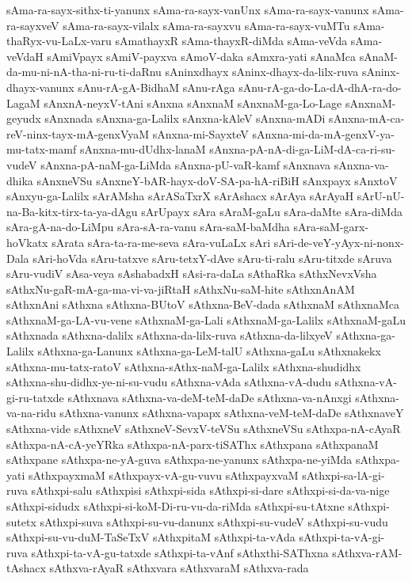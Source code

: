 {sAma-ra-sayx-sithx-ti-yanunx
sAma-ra-sayx-vanUnx
sAma-ra-sayx-vanunx
sAma-ra-sayxveV
sAma-ra-sayx-vilalx
sAma-ra-sayxvu
sAma-ra-sayx-vuMTu
sAma-thaRyx-vu-LaLx-varu
sAmathayxR
sAma-thayxR-diMda
sAma-veVda
sAma-veVdaH
sAmiVpayx
sAmiV-payxva
sAmoV-daka
sAmxra-yati
sAnaMca
sAnaM-da-mu-ni-nA-tha-ni-ru-ti-daRnu
sAninxdhayx
sAninx-dhayx-da-lilx-ruva
sAninx-dhayx-vanunx
sAnu-rA-gA-BidhaM
sAnu-rAga
sAnu-rA-ga-do-La-dA-dhA-ra-do-LagaM
sAnxnA-neyxV-tAni
sAnxna
sAnxnaM
sAnxnaM-ga-Lo-Lage
sAnxnaM-geyudx
sAnxnada
sAnxna-ga-Lalilx
sAnxna-kAleV
sAnxna-mADi
sAnxna-mA-ca-reV-ninx-tayx-mA-genxVyaM
sAnxna-mi-SayxteV
sAnxna-mi-da-mA-genxV-ya-mu-tatx-mamf
sAnxna-mu-dUdhx-lanaM
sAnxna-pA-nA-di-ga-LiM-dA-ca-ri-su-vudeV
sAnxna-pA-naM-ga-LiMda
sAnxna-pU-vaR-kamf
sAnxnava
sAnxna-va-dhika
sAnxneVSu
sAnxneY-bAR-hayx-doV-SA-pa-hA-riBiH
sAnxpayx
sAnxtoV
sAnxyu-ga-Lalilx
sArAMsha
sArASaTxrX
sArAshacx
sArAya
sArAyaH
sArU-nU-na-Ba-kitx-tirx-ta-ya-dAgu
sArUpayx
sAra
sAraM-gaLu
sAra-daMte
sAra-diMda
sAra-gA-na-do-LiMpu
sAra-sA-ra-vanu
sAra-saM-baMdha
sAra-saM-garx-hoVkatx
sArata
sAra-ta-ra-me-seva
sAra-vuLaLx
sAri
sAri-de-veY-yAyx-ni-nonx-Dala
sAri-hoVda
sAru-tatxve
sAru-tetxY-dAve
sAru-ti-ralu
sAru-titxde
sAruva
sAru-vudiV
sAsa-veya
sAshabadxH
sAsi-ra-daLa
sAthaRka
sAthxNevxVsha
sAthxNu-gaR-mA-ga-ma-vi-va-jiRtaH
sAthxNu-saM-hite
sAthxnAnAM
sAthxnAni
sAthxna
sAthxna-BUtoV
sAthxna-BeV-dada
sAthxnaM
sAthxnaMca
sAthxnaM-ga-LA-vu-vene
sAthxnaM-ga-Lali
sAthxnaM-ga-Lalilx
sAthxnaM-gaLu
sAthxnada
sAthxna-dalilx
sAthxna-da-lilx-ruva
sAthxna-da-lilxyeV
sAthxna-ga-Lalilx
sAthxna-ga-Lanunx
sAthxna-ga-LeM-talU
sAthxna-gaLu
sAthxnakekx
sAthxna-mu-tatx-ratoV
sAthxna-sAthx-naM-ga-Lalilx
sAthxna-shudidhx
sAthxna-shu-didhx-ye-ni-su-vudu
sAthxna-vAda
sAthxna-vA-dudu
sAthxna-vA-gi-ru-tatxde
sAthxnava
sAthxna-va-deM-teM-daDe
sAthxna-va-nAnxgi
sAthxna-va-na-ridu
sAthxna-vanunx
sAthxna-vapapx
sAthxna-veM-teM-daDe
sAthxnaveY
sAthxna-vide
sAthxneV
sAthxneV-SevxV-teVSu
sAthxneVSu
sAthxpa-nA-cAyaR
sAthxpa-nA-cA-yeYRka
sAthxpa-nA-parx-tiSAThx
sAthxpana
sAthxpanaM
sAthxpane
sAthxpa-ne-yA-guva
sAthxpa-ne-yanunx
sAthxpa-ne-yiMda
sAthxpa-yati
sAthxpayxmaM
sAthxpayx-vA-gu-vuvu
sAthxpayxvaM
sAthxpi-sa-lA-gi-ruva
sAthxpi-salu
sAthxpisi
sAthxpi-sida
sAthxpi-si-dare
sAthxpi-si-da-va-nige
sAthxpi-sidudx
sAthxpi-si-koM-Di-ru-vu-da-riMda
sAthxpi-su-tAtxne
sAthxpi-sutetx
sAthxpi-suva
sAthxpi-su-vu-danunx
sAthxpi-su-vudeV
sAthxpi-su-vudu
sAthxpi-su-vu-duM-TaSeTxV
sAthxpitaM
sAthxpi-ta-vAda
sAthxpi-ta-vA-gi-ruva
sAthxpi-ta-vA-gu-tatxde
sAthxpi-ta-vAnf
sAthxthi-SAThxna
sAthxva-rAM-tAshacx
sAthxva-rAyaR
sAthxvara
sAthxvaraM
sAthxva-rada
}
